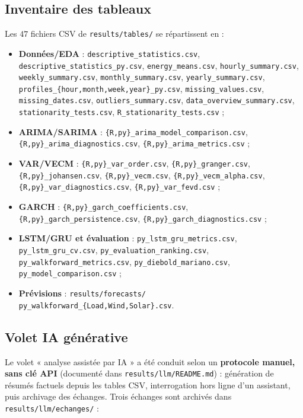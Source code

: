 \subsection{Inventaire des tableaux}
Les \(47\) fichiers CSV de \texttt{results/tables/} se répartissent en :
\begin{itemize}
  \item \textbf{Données/EDA} : \texttt{descriptive\_statistics.csv},
        \texttt{descriptive\_statistics\_py.csv}, \texttt{energy\_means.csv},
        \texttt{hourly\_summary.csv}, \texttt{weekly\_summary.csv},
        \texttt{monthly\_summary.csv}, \texttt{yearly\_summary.csv},
        \texttt{profiles\_\{hour,month,week,year\}\_py.csv},
        \texttt{missing\_values.csv}, \texttt{missing\_dates.csv},
        \texttt{outliers\_summary.csv}, \texttt{data\_overview\_summary.csv},
        \texttt{stationarity\_tests.csv}, \texttt{R\_stationarity\_tests.csv} ;
  \item \textbf{ARIMA/SARIMA} :
        \texttt{\{R,py\}\_arima\_model\_comparison.csv},
        \texttt{\{R,py\}\_arima\_diagnostics.csv},
        \texttt{\{R,py\}\_arima\_metrics.csv} ;
  \item \textbf{VAR/VECM} :
        \texttt{\{R,py\}\_var\_order.csv}, \texttt{\{R,py\}\_granger.csv},
        \texttt{\{R,py\}\_johansen.csv}, \texttt{\{R,py\}\_vecm.csv},
        \texttt{\{R,py\}\_vecm\_alpha.csv}, \texttt{\{R,py\}\_var\_diagnostics.csv},
        \texttt{\{R,py\}\_var\_fevd.csv} ;
  \item \textbf{GARCH} :
        \texttt{\{R,py\}\_garch\_coefficients.csv},
        \texttt{\{R,py\}\_garch\_persistence.csv},
        \texttt{\{R,py\}\_garch\_diagnostics.csv} ;
  \item \textbf{LSTM/GRU et évaluation} :
        \texttt{py\_lstm\_gru\_metrics.csv},
        \texttt{py\_lstm\_gru\_cv.csv},
        \texttt{py\_evaluation\_ranking.csv},
        \texttt{py\_walkforward\_metrics.csv},
        \texttt{py\_diebold\_mariano.csv},
        \texttt{py\_model\_comparison.csv} ;
  \item \textbf{Prévisions} : \texttt{results/forecasts/}
        \texttt{py\_walkforward\_\{Load,Wind,Solar\}.csv}.
\end{itemize}

\subsection{Volet IA générative}
Le volet « analyse assistée par IA » a été conduit selon un
\textbf{protocole manuel, sans clé API} (documenté dans
\texttt{results/llm/README.md}) : génération de résumés factuels depuis les
tables CSV, interrogation hors ligne d'un assistant, puis archivage des
échanges. Trois échanges sont archivés dans
\texttt{results/llm/echanges/} :

